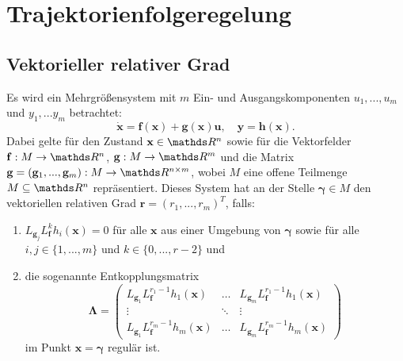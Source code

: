\section{Trajektorienfolgeregelung}

\subsection{Vektorieller relativer Grad}
\label{sec:definition_relative_degree}
Es wird ein Mehrgrößensystem mit $m$ Ein- und Ausgangskomponenten $u_1, ..., u_m$ und $y_1, ... y_m$ betrachtet:
\begin{equation}
	\dot{\mathbf{x}} = \mathbf{f}(\mathbf{x}) + \mathbf{g}(\mathbf{x}) \mathbf{u}, \quad \mathbf{y} = \mathbf{h}(\mathbf{x}).
\end{equation}
Dabei gelte für den Zustand $\mathbf{x} \in \Reals^n$ sowie für die Vektorfelder $\mathbf{f}: M \rightarrow \Reals^n$, $\mathbf{g}: M \rightarrow \Reals^m$ und die Matrix $\mathbf{g} = (\mathbf{g}_1, ..., \mathbf{g}_m): M \rightarrow \Reals^{n \times m}$, wobei $M$ eine offene Teilmenge $M \subseteq \Reals^{n}$ repräsentiert. Dieses System hat an der Stelle $\boldsymbol{\gamma} \in M$ den vektoriellen relativen Grad $\mathbf{r} = (r_1, ..., r_m)^T$, falls:
\begin{enumerate}
	\item $L_{\mathbf{g}_j} L_{\mathbf{f}}^k h_i(\mathbf{x}) = 0$ für alle $\mathbf{x}$ aus einer Umgebung von $\boldsymbol{\gamma}$ sowie für alle $i,j \in \{1, ..., m\}$ und $k \in \{0, ..., r-2\}$ und
	\item die sogenannte Entkopplungsmatrix
	\begin{equation}
		\label{eq:decoupling_matrix}
		\boldsymbol{\Lambda} = 
		\left(\begin{matrix}
		L_{\mathbf{g}_1} L_{\mathbf{f}}^{r_1 -1} h_1(\mathbf{x}) & \hdots & L_{\mathbf{g}_m} L_{\mathbf{f}}^{r_1 -1} h_1(\mathbf{x}) \\
		\vdots & \ddots & \vdots \\
		L_{\mathbf{g}_1} L_{\mathbf{f}}^{r_m -1} h_m(\mathbf{x}) & \hdots & L_{\mathbf{g}_m} L_{\mathbf{f}}^{r_m -1} h_m(\mathbf{x})
		\end{matrix}\right) 
	\end{equation}
	im Punkt $\mathbf{x} = \boldsymbol{\gamma}$ regulär ist.
\end{enumerate}
\cite[S. 194]{NLRT_Roebenack}

